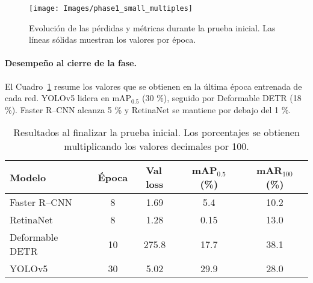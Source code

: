 \begin{figure}[!ht]
  \centering
  \texttt{[image: Images/phase1\_small\_multiples]}
  \caption[Curvas de pérdida y métricas de la Fase 1]{Evolución de las pérdidas y métricas durante la prueba inicial. Las líneas sólidas muestran los valores por época.}
  \label{fig:phase1_small_multiples}
\end{figure}

\paragraph{Desempeño al cierre de la fase.}
El Cuadro~\ref{tab:fase1_final} resume los valores que se obtienen en la última época entrenada de cada red.
YOLOv5 lidera en mAP$_{0.5}$ (30 \%), seguido por Deformable DETR (18 \%).
Faster R–CNN alcanza 5 \% y RetinaNet se mantiene por debajo del 1 \%.

\begin{table}[!ht]
  \centering
  \begin{tabular}{lcccc}
    \hline
    \textbf{Modelo} & \textbf{Época} & \textbf{Val\,loss} & \textbf{mAP$_{0.5}$ (\%)} & \textbf{mAR$_{100}$ (\%)}\\
    \hline
    Faster R–CNN        & 8  & 1.69  & 5.4  & 10.2 \\
    RetinaNet           & 8  & 1.28  & 0.15 & 13.0 \\
    Deformable DETR     & 10 & 275.8 & 17.7 & 38.1 \\
    YOLOv5              & 30 & 5.02  & 29.9 & 28.0 \\
    \hline
  \end{tabular}
  \caption[Resumen cuantitativo de la Fase 1]{Resultados al finalizar la prueba inicial. Los porcentajes se obtienen multiplicando los valores decimales por 100.}
  \label{tab:fase1_final}
\end{table}

